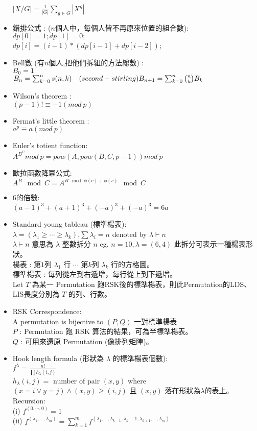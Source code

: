 \begin{itemize}
      $|X/G| = \frac{1}{|G|}\sum\limits_{g\in G} |X^g|$
    \item 錯排公式 :  ($n$個人中，每個人皆不再原來位置的組合數): \\
      $dp[0]=1;dp[1]=0;$\\
      $dp[i]=(i-1)*(dp[i-1]+dp[i-2])$;
    \item Bell數 (有$n$個人,把他們拆組的方法總數) : \\
      $B_0= 1$\\
      $B_n= \sum_{k=0}^{n} s(n,k)\quad (second-stirling)\\
      B_{n+1}= \sum_{k=0}^{n}{n \choose k} B_k$
    \item Wilson's theorem :\\
      $(p-1)! \equiv -1 (mod \ p)$
    \item Fermat's little theorem :\\
      $a^p \equiv a (mod \ p)$
    \item Euler's totient function:\\
      $ A ^ {B ^ C} mod \ p = pow(A,pow(B,C,p-1)) mod \ p$
    \item 歐拉函數降冪公式:\\
      $A^B \mod C=A^{B \mod \phi(c) + \phi(c)}\mod C$
    \item 6的倍數: \\
     $(a-1)^3 + (a+1)^3 + (-a)^3 + (-a)^3 = 6a$
    \item Standard young tableau (標準楊表): \\
      $\lambda=(\lambda _{1}\geq \cdots \geq \lambda _{k})$,$\sum \lambda _{i} = n$ denoted by $\lambda \vdash n$\\
      $\lambda \vdash n$ 意思為 $\lambda$ 整數拆分 $n$ eg. $n = 10,\lambda = (6,4)$ 此拆分可表示一種楊表形狀。\\
      楊表 : 第$1$列 $\lambda _{1}$ 行 $\cdots$ 第$k$列 $\lambda_{k}$ 行的方格圖。\\
      標準楊表 : 每列從左到右遞增，每行從上到下遞增。 \\
      Let $T$ 為某一 Permutation 跑RSK後的標準楊表，則此Permutation的LDS、LIS長度分別為 $T$ 的列、行數。 
    \item RSK Correspondence: \\
      A permutation is bijective to $(P,Q)$ 一對標準楊表 \\
      $P$ : Permutation 跑 RSK 算法的結果，可為半標準楊表。 \\
      $Q$ : 可用來還原 Permutation (像排列矩陣)。 
    \item Hook length formula (形狀為 $\lambda$ 的標準楊表個數): \\
      $f^{\lambda }={\frac {n!}{\prod h_{\lambda }(i,j)}}$ \\
      $h_{\lambda }(i,j)=$ number of pair $(x,y)$ where $(x = i \lor y = j) \land (x,y) \geq (i,j)$ 且 $(x,y)$ 落在形狀為$\lambda$的表上。\\
      Recursion:\\
      (i) $f^{(0,\cdots,0)} = 1$ \\
      (ii) $f^{(\lambda_{1},\cdots,\lambda_{m})} = \sum_{k=1}^{m} f^{(\lambda_{1},\cdots,\lambda_{k-1},\lambda_{k} - 1,\lambda_{k+1},\cdots,\lambda_{m})} $

\end{itemize}